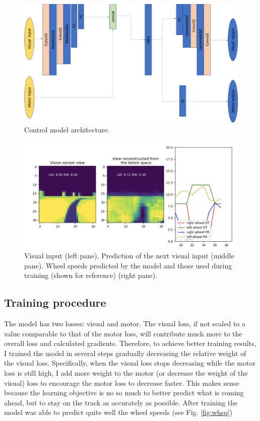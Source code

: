 \documentclass[11pt, oneside]{article}   	%
\begin{document}
\begin{figure}[h]
\includegraphics[width=\columnwidth]{Fig_5} 
\caption{Control model architecture.}
\label{fig:arc}
\end{figure}

\begin{figure}[h]
\includegraphics[width=\columnwidth]{Fig_4} 
\caption{Visual input (left pane). Prediction of the next visual input (middle pane). Wheel speeds predicted by the model and those used during training (shown for reference) (right pane). }
\label{fig:eval}
\end{figure}

\subsection{Training procedure}
The model has two losses: visual and motor. The visual loss, if not scaled to a value comparable to that of the motor loss, will contribute much more to the overall loss and calculated gradients. Therefore, to achi\-eve better training results, I trained the model in several steps gradually decreasing the relative weight of the visual loss. Specifically, when the visual loss stops decreasing while the motor loss is still high, I add more weight to the motor (or decrease the weight of the visual) loss to encourage the motor loss to decrease faster. This makes sense because the learning objective is no so much to better predict what is coming ahead, but to stay on the track as accurately as possible. After training the model was able to predict quite well the wheel speeds (see Fig. \ref{fig:whsp})
\end{document}
